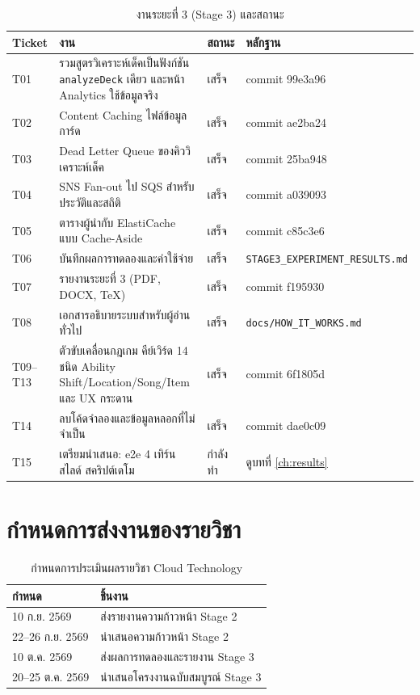 \begin{table}[H]
\centering
\caption{งานระยะที่ 3 (Stage 3) และสถานะ}
\label{tab:stage3_tickets}
\small
\begin{tabularx}{\textwidth}{lXll}
\toprule
\textbf{Ticket} & \textbf{งาน} & \textbf{สถานะ} & \textbf{หลักฐาน} \\
\midrule
T01 & รวมสูตรวิเคราะห์เด็คเป็นฟังก์ชัน \texttt{analyzeDeck} เดียว และหน้า Analytics ใช้ข้อมูลจริง & เสร็จ & commit 99e3a96 \\
T02 & Content Caching ไฟล์ข้อมูลการ์ด & เสร็จ & commit ae2ba24 \\
T03 & Dead Letter Queue ของคิววิเคราะห์เด็ค & เสร็จ & commit 25ba948 \\
T04 & SNS Fan-out ไป SQS สำหรับประวัติและสถิติ & เสร็จ & commit a039093 \\
T05 & ตารางผู้นำกับ ElastiCache แบบ Cache-Aside & เสร็จ & commit c85c3e6 \\
T06 & บันทึกผลการทดลองและค่าใช้จ่าย & เสร็จ & \texttt{STAGE3\_EXPERIMENT\_RESULTS.md} \\
T07 & รายงานระยะที่ 3 (PDF, DOCX, TeX) & เสร็จ & commit f195930 \\
T08 & เอกสารอธิบายระบบสำหรับผู้อ่านทั่วไป & เสร็จ & \texttt{docs/HOW\_IT\_WORKS.md} \\
T09--T13 & ตัวขับเคลื่อนกฎเกม คีย์เวิร์ด 14 ชนิด Ability Shift/Location/Song/Item และ UX กระดาน & เสร็จ & commit 6f1805d \\
T14 & ลบโค้ดจำลองและข้อมูลหลอกที่ไม่จำเป็น & เสร็จ & commit dae0c09 \\
T15 & เตรียมนำเสนอ: e2e 4 เทิร์น สไลด์ สคริปต์เดโม & กำลังทำ & ดูบทที่ \ref{ch:results} \\
\bottomrule
\end{tabularx}
\end{table}

\section{กำหนดการส่งงานของรายวิชา}

\begin{table}[H]
\centering
\caption{กำหนดการประเมินผลรายวิชา Cloud Technology}
\label{tab:milestones}
\begin{tabularx}{\textwidth}{lX}
\toprule
\textbf{กำหนด} & \textbf{ชิ้นงาน} \\
\midrule
10 ก.ย. 2569 & ส่งรายงานความก้าวหน้า Stage 2 \\
22--26 ก.ย. 2569 & นำเสนอความก้าวหน้า Stage 2 \\
10 ต.ค. 2569 & ส่งผลการทดลองและรายงาน Stage 3 \\
20--25 ต.ค. 2569 & นำเสนอโครงงานฉบับสมบูรณ์ Stage 3 \\
\bottomrule
\end{tabularx}
\end{table}

